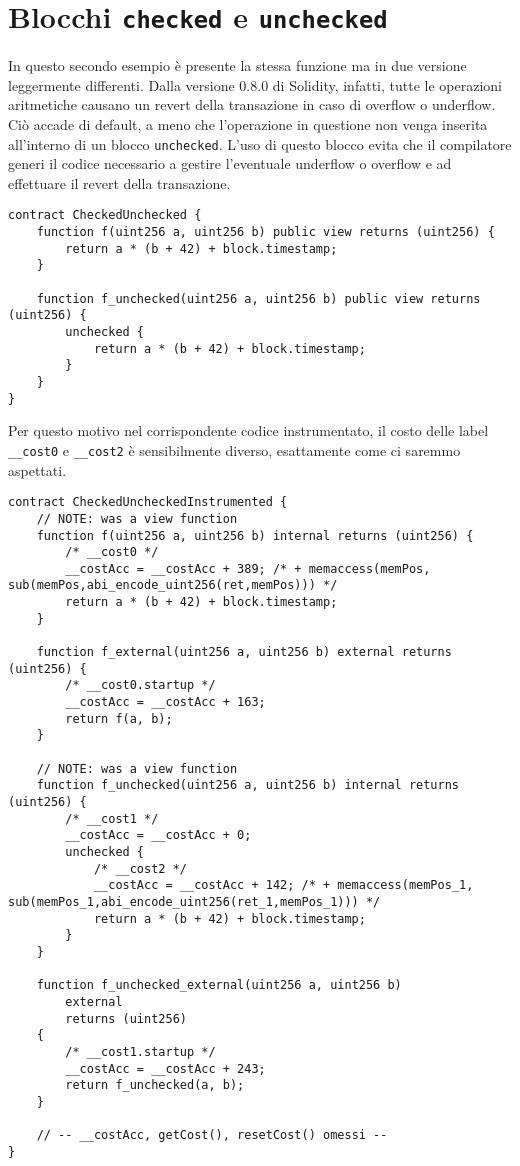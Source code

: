 \documentclass[12pt,a4paper,openright,oneside]{report}
\theoremstyle{definition}
\begin{document}
\section{Blocchi \texttt{checked} e \texttt{unchecked}}
In questo secondo esempio \`{e} presente la stessa funzione ma in due versione leggermente differenti. Dalla versione 0.8.0 di Solidity, infatti, tutte le operazioni aritmetiche causano un revert della transazione in caso di overflow o underflow. Ci\`{o} accade di default, a meno che l'operazione in questione non venga inserita all'interno di un blocco \texttt{unchecked}. L'uso di questo blocco evita che il compilatore generi il codice necessario a gestire l'eventuale underflow o overflow e ad effettuare il revert della transazione.    
\begin{lstlisting}[language=Solidity,caption={Esempio Solidity con blocchi \texttt{unchecked} e non},label={lst:checked_unchecked},frame=tlrb]
contract CheckedUnchecked {
    function f(uint256 a, uint256 b) public view returns (uint256) {
        return a * (b + 42) + block.timestamp;
    }

    function f_unchecked(uint256 a, uint256 b) public view returns (uint256) {
        unchecked {
            return a * (b + 42) + block.timestamp;
        }
    }
}
\end{lstlisting}
Per questo motivo nel corrispondente codice instrumentato, il costo delle label \texttt{\_\_cost0} e \texttt{\_\_cost2} \`{e} sensibilmente diverso, esattamente come ci saremmo aspettati. 
\begin{lstlisting}[language=Solidity,caption={Instrumentazione di \ref{lst:checked_unchecked}},label={lst:checked_unchecked_instrumented},frame=tlrb]
contract CheckedUncheckedInstrumented {
    // NOTE: was a view function
    function f(uint256 a, uint256 b) internal returns (uint256) {
        /* __cost0 */
        __costAcc = __costAcc + 389; /* + memaccess(memPos, sub(memPos,abi_encode_uint256(ret,memPos))) */
        return a * (b + 42) + block.timestamp;
    }

    function f_external(uint256 a, uint256 b) external returns (uint256) {
        /* __cost0.startup */
        __costAcc = __costAcc + 163;
        return f(a, b);
    }

    // NOTE: was a view function
    function f_unchecked(uint256 a, uint256 b) internal returns (uint256) {
        /* __cost1 */
        __costAcc = __costAcc + 0;
        unchecked {
            /* __cost2 */
            __costAcc = __costAcc + 142; /* + memaccess(memPos_1, sub(memPos_1,abi_encode_uint256(ret_1,memPos_1))) */
            return a * (b + 42) + block.timestamp;
        }
    }

    function f_unchecked_external(uint256 a, uint256 b)
        external
        returns (uint256)
    {
        /* __cost1.startup */
        __costAcc = __costAcc + 243;
        return f_unchecked(a, b);
    }

    // -- __costAcc, getCost(), resetCost() omessi --
}
\end{lstlisting}
\end{document}
